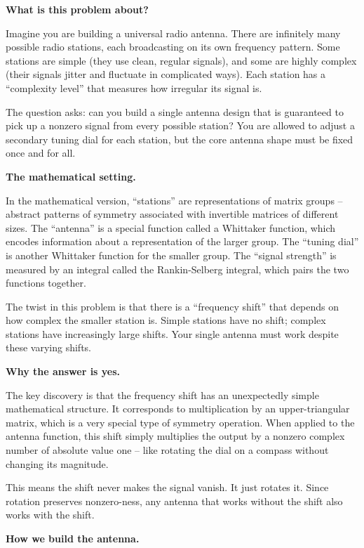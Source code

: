 
\textbf{What is this problem about?}

Imagine you are building a universal radio antenna. There are infinitely
many possible radio stations, each broadcasting on its own frequency
pattern. Some stations are simple (they use clean, regular signals),
and some are highly complex (their signals jitter and fluctuate in
complicated ways). Each station has a ``complexity level'' that
measures how irregular its signal is.

The question asks: can you build a single antenna design that is
guaranteed to pick up a nonzero signal from every possible station?
You are allowed to adjust a secondary tuning dial for each station,
but the core antenna shape must be fixed once and for all.

\textbf{The mathematical setting.}

In the mathematical version, ``stations'' are representations of
matrix groups -- abstract patterns of symmetry associated with
invertible matrices of different sizes. The ``antenna'' is a
special function called a Whittaker function, which encodes
information about a representation of the larger group. The
``tuning dial'' is another Whittaker function for the smaller group.
The ``signal strength'' is measured by an integral called the
Rankin-Selberg integral, which pairs the two functions together.

The twist in this problem is that there is a ``frequency shift''
that depends on how complex the smaller station is. Simple stations
have no shift; complex stations have increasingly large shifts.
Your single antenna must work despite these varying shifts.

\textbf{Why the answer is yes.}

The key discovery is that the frequency shift has an unexpectedly
simple mathematical structure. It corresponds to multiplication by
an upper-triangular matrix, which is a very special type of
symmetry operation. When applied to the antenna function, this
shift simply multiplies the output by a nonzero complex number of
absolute value one -- like rotating the dial on a compass without
changing its magnitude.

This means the shift never makes the signal vanish. It just
rotates it. Since rotation preserves nonzero-ness, any antenna
that works without the shift also works with the shift.

\textbf{How we build the antenna.}


